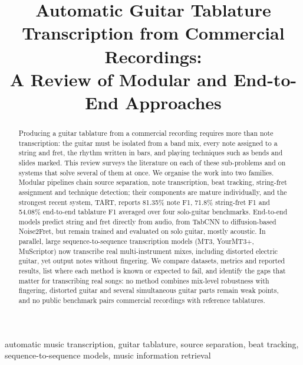 \documentclass[conference]{IEEEtran}
\title{Automatic Guitar Tablature Transcription from Commercial Recordings:\\
A Review of Modular and End-to-End Approaches}
\author{
  \IEEEauthorblockN{Breno de Angelo}
  \IEEEauthorblockA{
    UFES \\
    Email: breno.angelo@lcad.inf.ufes.br
  }
}
\begin{document}
\maketitle

\begin{abstract}
Producing a guitar tablature from a commercial recording requires more than
note transcription: the guitar must be isolated from a band mix, every note
assigned to a string and fret, the rhythm written in bars, and playing
techniques such as bends and slides marked. This review surveys the literature
on each of these sub-problems and on systems that solve several of them at
once. We organise the work into two families. Modular pipelines chain source
separation, note transcription, beat tracking, string-fret assignment and
technique detection; their components are mature individually, and the
strongest recent system, TART, reports 81.35\% note F1, 71.8\% string-fret F1
and 54.08\% end-to-end tablature F1 averaged over four solo-guitar benchmarks.
End-to-end models predict string and fret directly from audio, from TabCNN to
diffusion-based Noise2Fret, but remain trained and evaluated on solo guitar,
mostly acoustic. In parallel, large sequence-to-sequence transcription models
(MT3, YourMT3+, MuScriptor) now transcribe real multi-instrument mixes,
including distorted electric guitar, yet output notes without fingering. We
compare datasets, metrics and reported results, list where each method is known
or expected to fail, and identify the gaps that matter for transcribing real
songs: no method combines mix-level robustness with fingering, distorted
guitar and several simultaneous guitar parts remain weak points, and no public
benchmark pairs commercial recordings with reference tablatures.
\end{abstract}

\begin{IEEEkeywords}
automatic music transcription, guitar tablature, source separation,
beat tracking, sequence-to-sequence models, music information retrieval
\end{IEEEkeywords}











\end{document}
